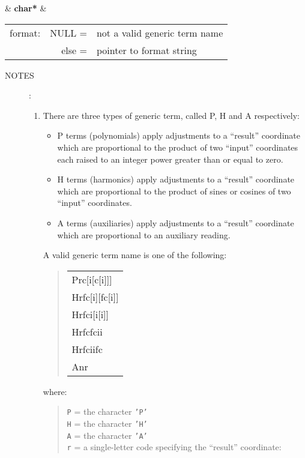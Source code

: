 \documentclass[12pt,fleqn,twoside]{article}
\renewcommand{\_}{{\tt\char'137}}     %
\newcommand{\spec}[3]
{
  {\em {#1}} & {\bf \mbox{#2}} & {#3}
}
\newcommand{\notes}[1]
{
  \goodbreak
  \begin{description}
    \item[NOTES]: \nopagebreak
        #1
  \end{description}
  \vspace{-3ex}
}
\begin{document}
{
\spec{}{char*}{\hspace{-2ex}
               \begin{tabular}[t]{lrl}
                  format: & NULL = & not a valid generic term name \\
                          & else = & pointer to format string \\
               \end{tabular}
              }
}
\notes{
\begin{enumerate}
\setlength{\parskip}{\medskipamount}
\item There are three types of generic term, called P, H and A respectively:
      \begin{itemize}
      \item P terms (polynomials) apply adjustments
            to a ``result'' coordinate
            which are proportional to the product
            of two ``input'' coordinates
            each raised to an integer power greater
            than or equal to zero.
      \item H terms (harmonics) apply adjustments
            to a ``result'' coordinate
            which are proportional to the product
            of sines or cosines of two
            ``input'' coordinates.
      \item A terms (auxiliaries) apply adjustments
            to a ``result'' coordinate
            which are proportional to an auxiliary reading.
      \end{itemize}
      A valid generic term name is one of the following:
      \begin{quote}
      {\tt \begin{tabular}{l}
           Prc[i[c[i]]] \\
           Hrfc[i][fc[i]] \\
           Hrfci[i[i]] \\
           Hrfcfcii \\
           Hrfciifc \\
           Anr \\
           \end{tabular}}
      \end{quote}
      where:
      \begin{quote}
        {\tt P} = the character {\tt 'P'} \\
        {\tt H} = the character {\tt 'H'} \\
        {\tt A} = the character {\tt 'A'} \\
        {\tt r} = a single-letter code specifying the ``result'' coordinate:

\end{quote}
\end{enumerate}}
\end{document}
